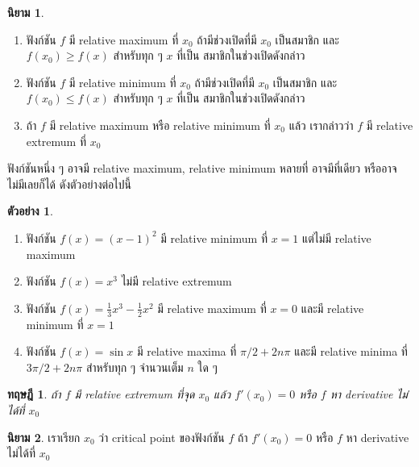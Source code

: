 \documentclass[
]{book}
\newtheorem{theorem}{ทฤษฎี}[chapter]
\theoremstyle{definition}
\newtheorem{definition}{นิยาม}[chapter]
\theoremstyle{definition}
\newtheorem{example}{ตัวอย่าง}[chapter]
\theoremstyle{definition}
\theoremstyle{definition}
\theoremstyle{remark}
\begin{document}
\begin{definition}
\leavevmode

\begin{enumerate}
\def\labelenumi{\arabic{enumi}.}
\item
  ฟังก์ชัน \(f\) มี relative maximum ที่ \(x_0\) ถ้ามีช่วงเปิดที่มี \(x_0\) เป็นสมาชิก และ
  \(f(x_0) \ge f(x)\) สำหรับทุก ๆ \(x\) ที่เป็น สมาชิกในช่วงเปิดดังกล่าว
\item
  ฟังก์ชัน \(f\) มี relative minimum ที่ \(x_0\) ถ้ามีช่วงเปิดที่มี \(x_0\) เป็นสมาชิก และ
  \(f(x_0) \le f(x)\) สำหรับทุก ๆ \(x\) ที่เป็น สมาชิกในช่วงเปิดดังกล่าว
\item
  ถ้า \(f\) มี relative maximum หรือ relative minimum ที่ \(x_0\) แล้ว เรากล่าวว่า
  \(f\) มี relative extremum ที่ \(x_0\)
\end{enumerate}

\end{definition}

ฟังก์ชันหนึ่ง ๆ อาจมี relative maximum, relative minimum หลายที่ อาจมีที่เดียว
หรืออาจไม่มีเลยก็ได้ ดังตัวอย่างต่อไปนี้

\begin{example}
\leavevmode

\begin{enumerate}
\def\labelenumi{\arabic{enumi}.}
\item
  ฟังก์ชัน \(f(x) = (x-1)^2\) มี relative minimum ที่ \(x=1\) แต่ไม่มี relative
  maximum
\item
  ฟังก์ชัน \(f(x) = x^3\) ไม่มี relative extremum
\item
  ฟังก์ชัน \(f(x) = \frac{1}{3}x^3 - \frac{1}{2}x^2\) มี relative maximum ที่
  \(x=0\) และมี relative minimum ที่ \(x=1\)
\item
  ฟังก์ชัน \(f(x) = \sin x\) มี relative maxima ที่ \(\pi/2 + 2n\pi\) และมี
  relative minima ที่ \(3\pi/2 + 2n\pi\) สำหรับทุก ๆ จำนวนเต็ม \(n\) ใด ๆ
\end{enumerate}

\end{example}

\begin{theorem}
ถ้า \(f\) มี relative extremum ที่จุด \(x_0\) แล้ว \(f'(x_0) = 0\) หรือ \(f\) หา
derivative ไม่ได้ที่ \(x_0\)
\end{theorem}

\begin{definition}
เราเรียก \(x_0\) ว่า critical point ของฟังก์ชัน \(f\) ถ้า \(f'(x_0) = 0\) หรือ \(f\) หา
derivative ไม่ได้ที่ \(x_0\)
\end{definition}
\end{document}
